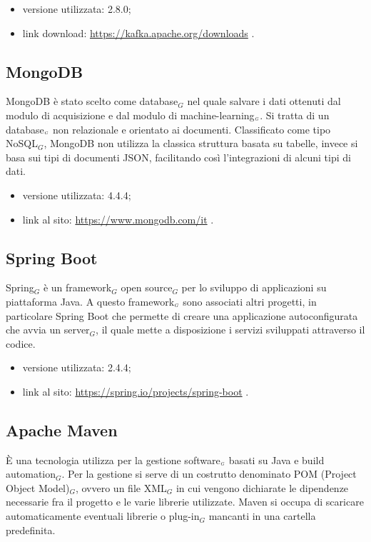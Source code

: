 \begin{itemize}
  \item versione utilizzata: 2.8.0;
  \item link download: \url{https://kafka.apache.org/downloads} .
\end{itemize}

\subsection{MongoDB}\label{TecnologieMongoDB}
MongoDB è stato scelto come database$_G$ nel quale salvare i dati ottenuti dal modulo di acquisizione e dal modulo di machine-learning$_{\scaleto{G}{3pt}}$.
Si tratta di un database$_{\scaleto{G}{3pt}}$ non relazionale e orientato ai documenti.
Classificato come tipo NoSQL$_G$, MongoDB non utilizza la classica struttura basata su tabelle, invece si basa sui tipi di documenti JSON, facilitando così l'integrazioni di alcuni tipi di dati.

\begin{itemize}
    \item versione utilizzata: 4.4.4;
    \item link al sito: \url{https://www.mongodb.com/it} .
\end{itemize}

\subsection{Spring Boot} \label{TecnologieSpring}
Spring$_G$ è un framework$_G$ open source$_G$ per lo sviluppo di applicazioni su piattaforma Java. A  questo framework$_{\scaleto{G}{3pt}}$ sono associati altri progetti, in particolare Spring Boot che permette di creare una applicazione autoconfigurata che avvia un server$_G$, il quale mette a disposizione i servizi sviluppati attraverso il codice.
\begin{itemize}
	\item versione utilizzata: 2.4.4;
	\item link al sito: \url{https://spring.io/projects/spring-boot} .
\end{itemize}

\subsection{Apache Maven}\label{TecnologieMaven}
È una tecnologia utilizza per la gestione software$_{\scaleto{G}{3pt}}$ basati su Java e build automation$_G$.
Per la gestione si serve di un costrutto denominato POM (Project Object Model)$_G$, ovvero un file XML$_G$ in cui vengono dichiarate le dipendenze necessarie fra il progetto e le varie librerie utilizzate.
Maven si occupa di scaricare automaticamente eventuali librerie o plug-in$_G$ mancanti in una cartella predefinita.


